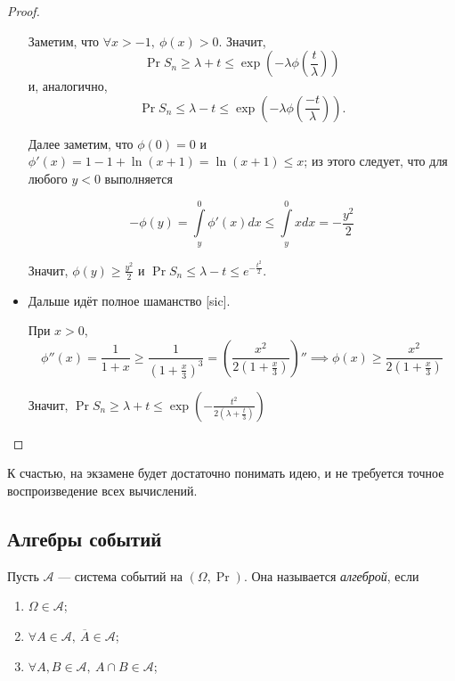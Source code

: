 \begin{proof}
\begin{itemize}
        Заметим, что $\forall x > -1,\ \phi(x)>0$. Значит,
        \[
        \Pr{S_n \geq \lambda + t} \leq \exp\left(-\lambda\phi\left( \frac{t}{\lambda} \right) \right)
        \]
        и, аналогично,
        \[
        \Pr{S_n \leq \lambda - t} \leq \exp\left(-\lambda\phi\left( \frac{-t}{\lambda} \right)
        \right).
        \]
        
        Далее заметим, что $\phi(0) = 0$ и $\phi'(x) = 1 - 1 + \ln(x+1) = \ln(x+1) \leq x$; из этого
        следует, что для любого $y < 0$ выполняется
        
        \[
        -\phi(y) = \int\limits_y^0 \phi'(x)dx \leq \int\limits_y^0xdx = -\frac{y^2}{2}
        \]
        
        Значит, $\phi(y) \geq \frac{y^2}{2}$ и $\Pr{S_n \leq \lambda - t} \leq e^{-\frac{t^2}{2}}$.
        
        \item \circled{$\geq$}
        
        Дальше идёт полное шаманство [sic].
        
        При $x>0$,
        \[
        \phi''(x) = \frac{1}{1+x} \geq \frac{1}{\left( 1+\frac{x}{3} \right)^3} = \left(
        \frac{x^2}{2\left( 1+\frac{x}{3} \right)} \right)'' \implies
        \phi(x) \geq \frac{x^2}{2\left( 1+\frac{x}{3} \right)}
        \]
        
        Значит, $\Pr{S_n \geq \lambda + t} \leq \exp\left( -\frac{t^2}{2\left( \lambda+\frac{t}{3} \right)} \right)$
    \end{itemize}
\end{proof}


К счастью, на экзамене будет достаточно понимать идею, и не требуется точное воспроизведение всех 
вычислений.

\subsection{Алгебры событий}
\begin{definition}
    Пусть $\mathcal{A}$ --- система событий на $(\Omega, \Pr)$. Она называется \emph{алгеброй}, если
    
    \begin{enumerate}
        \item $\Omega \in \mathcal{A}$;
        \item $\forall A \in \mathcal{A},\ \overline{A} \in \mathcal{A}$;
        \item $\forall A, B \in \mathcal{A},\ A\cap B \in \mathcal{A}$;
    \end{enumerate}
\end{definition}

